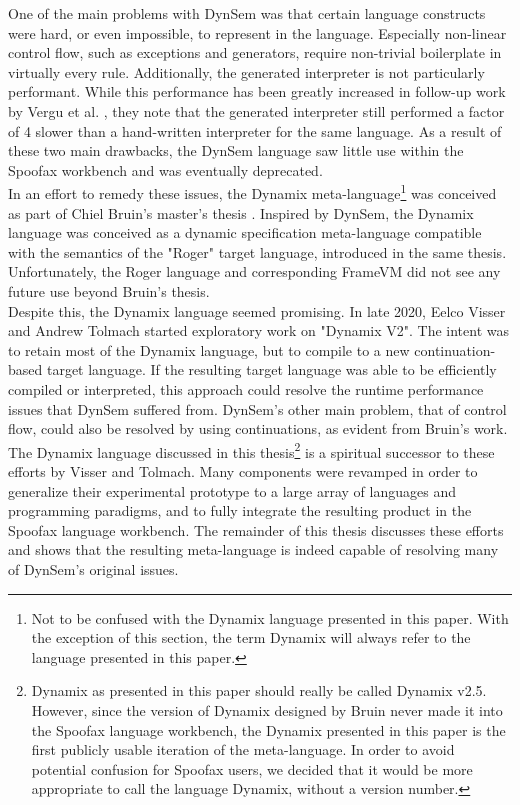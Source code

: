 One of the main problems with DynSem was that certain language constructs were hard, or even impossible, to represent in the language. Especially non-linear control flow, such as exceptions and generators, require non-trivial boilerplate in virtually every rule. Additionally, the generated interpreter is not particularly performant. While this performance has been greatly increased in follow-up work by Vergu et al. \cite{VerguV18}, they note that the generated interpreter still performed a factor of 4 slower than a hand-written interpreter for the same language. As a result of these two main drawbacks, the DynSem language saw little use within the Spoofax workbench and was eventually deprecated.\\

In an effort to remedy these issues, the Dynamix meta-language\footnote{Not to be confused with the Dynamix language presented in this paper. With the exception of this section, the term Dynamix will always refer to the language presented in this paper.} was conceived as part of Chiel Bruin's master's thesis \cite{Bruin2020}. Inspired by DynSem, the Dynamix language was conceived as a dynamic specification meta-language compatible with the semantics of the "Roger" target language, introduced in the same thesis. Unfortunately, the Roger language and corresponding FrameVM did not see any future use beyond Bruin's thesis.\\

Despite this, the Dynamix language seemed promising. In late 2020, Eelco Visser and Andrew Tolmach started exploratory work on "Dynamix V2". The intent was to retain most of the Dynamix language, but to compile to a new continuation-based target language. If the resulting target language was able to be efficiently compiled or interpreted, this approach could resolve the runtime performance issues that DynSem suffered from. DynSem's other main problem, that of control flow, could also be resolved by using continuations, as evident from Bruin's work.\\

The Dynamix language discussed in this thesis\footnote{Dynamix as presented in this paper should really be called Dynamix v2.5. However, since the version of Dynamix designed by Bruin never made it into the Spoofax language workbench, the Dynamix presented in this paper is the first publicly usable iteration of the meta-language. In order to avoid potential confusion for Spoofax users, we decided that it would be more appropriate to call the language Dynamix, without a version number.} is a spiritual successor to these efforts by Visser and Tolmach. Many components were revamped in order to generalize their experimental prototype to a large array of languages and programming paradigms, and to fully integrate the resulting product in the Spoofax language workbench. The remainder of this thesis discusses these efforts and shows that the resulting meta-language is indeed capable of resolving many of DynSem's original issues.
